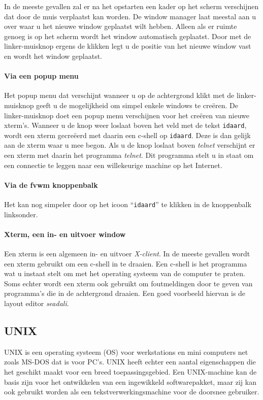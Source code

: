 In de meeste gevallen zal er na het opstarten een kader op het scherm
verschijnen dat door de muis verplaatst kan worden. De window manager
laat meestal aan u over waar u het nieuwe window geplaatst wilt hebben.
Alleen als er ruimte genoeg is op het scherm wordt het window automatisch
geplaatst.
Door met de linker-muisknop ergens de klikken legt u de positie van
het nieuwe window vast en wordt het window geplaatst.
\paragraph{Via een popup menu}
Het popup menu dat verschijnt wanneer u op de achtergrond klikt met
de linker-muisknop geeft u de mogelijkheid om simpel enkele
windows te cre\"eren. De linker-muisknop doet een popup menu verschijnen
voor het cre\"eren van nieuwe xterm's. 
Wanneer u de knop weer loslaat boven het veld met de tekst
{\tt idaard}, wordt een xterm gecre\"eerd 
met daarin een c-shell op {\tt idaard}.
Deze is dan gelijk aan de xterm waar u mee begon.
Als u de knop loslaat boven {\em telnet} verschijnt er een xterm met daarin
het programma {\em telnet}.
Dit programma stelt u in staat om een connectie te leggen naar een willekeurige
machine op het Internet. 
\paragraph{Via de fvwm knoppenbalk}
Het kan nog simpeler door op het icoon ``{\tt idaard}'' te klikken in de knoppenbalk linksonder.
\paragraph{Xterm, een in- en uitvoer window}
\label{xterm}
Een xterm is een algemeen in- en uitvoer {\em X-client}.
In de meeste gevallen wordt een xterm gebruikt om een c-shell in te draaien.
Een c-shell is het programma wat u instaat stelt om met het operating
systeem van de computer te praten. 
Soms echter wordt een xterm ook gebruikt om foutmeldingen door
te geven van programma's die in de achtergrond draaien. 
Een goed voorbeeld hiervan is de layout editor {\em seadali}.
\subsection{UNIX}
\label{UNIX}
UNIX is een operating systeem (OS) voor werkstations en mini
computers net zoals MS-DOS dat is voor PC's.
UNIX heeft echter een aantal eigenschappen die het geschikt maakt
voor een breed toepassingsgebied. Een UNIX-machine kan de basis
zijn voor het ontwikkelen van een ingewikkeld softwarepakket, maar
zij kan ook gebruikt worden als een tekstverwerkingsmachine voor
de doorsnee gebruiker.

